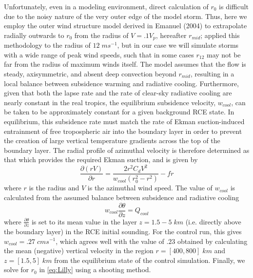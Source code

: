 \documentclass[12pt]{article}
\begin{document}
Unfortunately, even in a modeling environment, direct calculation of $r_0$ is difficult due to the noisy nature of the very outer edge of the model storm. Thus, here we employ the outer wind structure model derived in Emanuel (2004) to extrapolate radially outwards to $r_0$ from the radius of $V=.1V_p$, hereafter $r_{mid}$; \cite{Chavas_Emanuel_2010} applied this methodology to the radius of $12 \; ms^{-1}$, but in our case we will simulate storms with a wide range of peak wind speeds, such that in some cases $r_{12}$ may not be far from the radius of maximum winds itself. The model assumes that the flow is steady, axisymmetric, and absent deep convection beyond $r_{mid}$, resulting in a local balance between subsidence warming and radiative cooling. Furthermore, given that both the lapse rate and the rate of clear-sky radiative cooling are nearly constant in the real tropics, the equilibrium subsidence velocity, $w_{cool}$, can be taken to be approximately constant for a given background RCE state. In equilibrium, this subsidence rate must match the rate of Ekman suction-induced entrainment of free tropospheric air into the boundary layer in order to prevent the creation of large vertical temperature gradients across the top of the boundary layer. The radial profile of azimuthal velocity is therefore determined as that which provides the required Ekman suction, and is given by
\begin{equation}
    \label{eq:Lilly}
    \frac{\partial (rV)}{\partial r}=\frac{2r^2C_dV^2}{w_{cool}(r_0^2-r^2)}-fr
\end{equation}
where $r$ is the radius and $V$ is the azimuthal wind speed. The value of $w_{cool}$ is calculated from the assumed balance between subsidence and radiative cooling
\begin{equation}
    \label{eq:radsub}
    w_{cool} \frac{\partial \theta}{\partial z}=Q_{cool}
\end{equation}
where $\frac{\partial \theta}{\partial z}$ is set to its mean value in the layer $z=1.5-5 \; km$ (i.e. directly above the boundary layer) in the RCE initial sounding. For the control run, this gives $w_{cool} = .27 \; cm s^{-1}$, which agrees well with the value of $.23$ obtained by calculating the mean (negative) vertical velocity in the region $r = [400, 800] \; km$ and $z = [1.5, 5] \; km$ from the equilibrium state of the control simulation.  Finally, we solve for $r_0$ in \eqref{eq:Lilly} using a shooting method.
\end{document}
